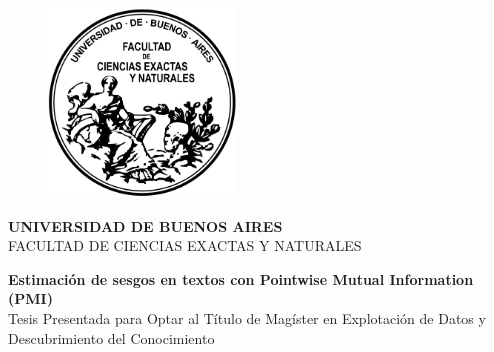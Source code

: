 
\begin{titlepage}



    \begin{figure}[!htb]
        \centering
        \includegraphics[width=5cm]{img/institucional/1200px-Logo-fcenuba.png}
    \end{figure}


    \begin{center}
        \Large{\textbf{UNIVERSIDAD DE BUENOS AIRES}}
        \vspace{3mm}
        \\ \normalsize{FACULTAD DE CIENCIAS EXACTAS Y NATURALES}
        \vspace{6mm}
    \end{center}


    \vspace{8mm}
    \begin{center}
        \LARGE{\textbf{Estimación de sesgos en textos con Pointwise Mutual Information (PMI)}}
        \vspace{13mm}
        \\ \normalsize{Tesis Presentada para Optar al Título de Magíster en Explotación de Datos y Descubrimiento del Conocimiento}
        \vspace{13mm}
    \end{center}

    \vspace{20mm}


\end{titlepage}
